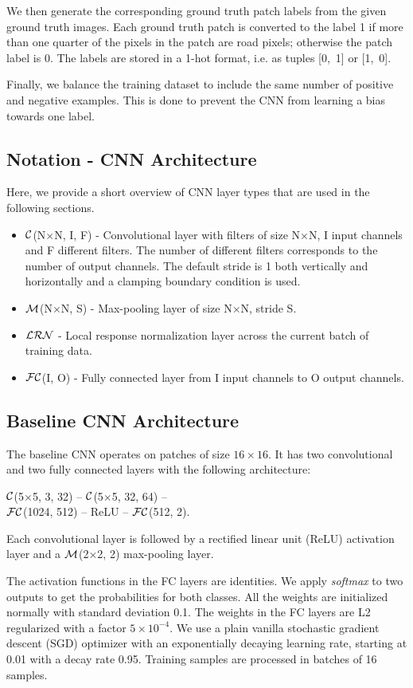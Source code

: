 \documentclass[10pt,conference,compsocconf]{IEEEtran}
\newcommand{\conv}[3]{$ \cal{C} $(#1$ \times  $#1, #2, #3)}
\newcommand{\maxpool}[2]{$ \cal{M} $(#1$ \times $#1, #2)}
\newcommand{\lrn}{$ \cal{LRN}~$}
\newcommand{\fc}[2]{$ \cal{FC} $(#1, #2)}
\begin{document}
We then generate the corresponding ground truth patch labels from the given ground truth images. Each ground truth patch is converted to the label 1 if more than one quarter of the pixels in the patch are road pixels; otherwise the patch label is 0. The labels are stored in a 1-hot format, i.e. as tuples \mbox{[0, 1]} or \mbox{[1, 0]}.

Finally, we balance the training dataset to include the same number of positive and negative examples. This is done to prevent the CNN from learning a bias towards one label.

\subsection{Notation - CNN Architecture}
Here, we provide a short overview of CNN layer types that are used in the following sections.
\begin{itemize}
	\item \conv{N}{I}{F} - Convolutional layer with filters of size N$ \times $N, I input channels and F different filters. The number of different filters corresponds to the number of output channels. The default stride is 1 both vertically and horizontally and a clamping boundary condition is used.
	\item \maxpool{N}{S} - Max-pooling layer of size N$ \times $N, stride S.
	\item \lrn - Local response normalization layer across the current batch of training data.
	\item \fc{I}{O} - Fully connected layer from I input channels to O output channels.
\end{itemize}

\subsection{Baseline CNN Architecture}
\label{subsec:baselineCNN}
The baseline CNN operates on patches of size $16 \times 16$. It has two convolutional and two fully connected layers with the following architecture:
\begin{center}
	\conv{5}{3}{32} -- \conv{5}{32}{64} -- \\ 
	\fc{1024}{512} -- ReLU -- \fc{512}{2}.
\end{center}
Each convolutional layer is followed by a rectified linear unit (ReLU) activation layer and a \maxpool{2}{2} max-pooling layer.

The activation functions in the FC layers are identities. We apply \textit{softmax} to two outputs to get the probabilities for both classes. All the weights are initialized normally with standard deviation 0.1. The weights in the FC layers are L2 regularized with a factor $ 5 \times 10^{-4} $. We use a plain vanilla stochastic gradient descent (SGD) optimizer with an exponentially decaying learning rate, starting at 0.01 with a decay rate 0.95. Training samples are processed in batches of 16 samples.
\end{document}
